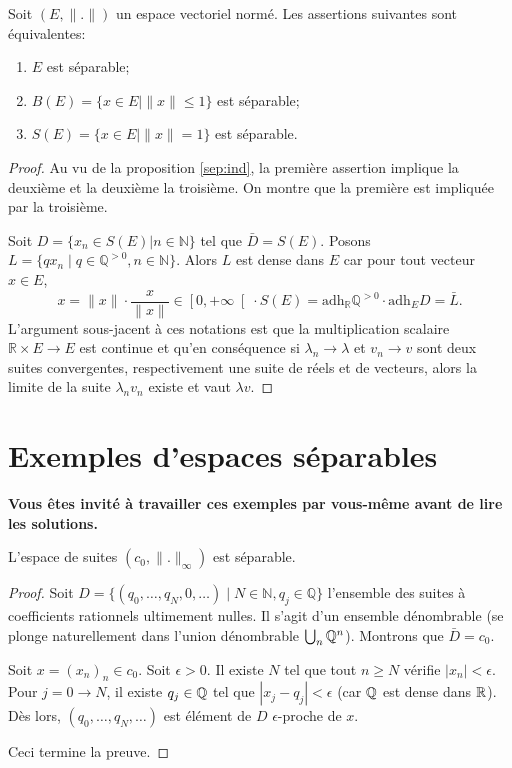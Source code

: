 \begin{prop}
  Soit $(E, \|.\|)$ un espace vectoriel normé. Les assertions suivantes sont
  équivalentes:
  \begin{enumerate}
  \item $E$ est séparable;
  \item $B(E) = \{x\in E\mid \|x\|\leq 1\}$ est séparable;
  \item $S(E) = \{x\in E\mid \|x\| =  1\}$ est séparable.
  \end{enumerate}
\end{prop}
\begin{proof}
  Au vu de la proposition \ref{sep:ind}, la première assertion implique
  la deuxième et la deuxième la troisième. On montre que la première
  est impliquée par la troisième.

  Soit $D = \{x_n \in S(E) | n\in\mathbb N\}$ tel que $\bar D = S(E)$.
  Posons $L = \{qx_n\mid q\in\mathbb Q^{>0}, n\in\mathbb N\}$. Alors $L$ est
  dense dans $E$ car pour tout vecteur $x\in E$,
  $$x = \|x\| \cdot \frac{x}{\|x\|}\in \left[0, +\infty \right[ \cdot S(E)
  = \mathrm{adh}_{\mathbb R}\mathbb Q^{>0}\cdot \mathrm{adh}_{E}D = \bar L.$$
  {L'argument sous-jacent à ces notations est que la multiplication
    scalaire $\mathbb R\times E\to E$ est continue et qu'en conséquence
    si $\lambda_n\to\lambda$ et $v_n\to v$ sont deux suites convergentes,
    respectivement une suite de réels et de vecteurs, alors la limite de
  la suite $\lambda_nv_n$ existe et vaut $\lambda v$}.
\end{proof}
\section{Exemples d'espaces séparables}
\textbf{Vous êtes invité à travailler ces exemples par vous-même avant de lire
les solutions.}
\begin{ex}
  L'espace de suites $(c_0, \|.\|_\infty)$ est séparable.
\end{ex}
\begin{proof}
  Soit $D = \{(q_0, \ldots, q_N, 0, \ldots)\mid
  N\in\mathbb N, q_j \in\mathbb Q\}$ l'ensemble des suites à coefficients
  rationnels ultimement nulles. Il s'agit d'un ensemble dénombrable
  (se plonge naturellement dans l'union dénombrable $\bigcup_{n}\mathbb{Q}^n$).
  Montrons que $\bar D = c_0$.

  Soit $x = (x_n)_n\in c_0$.
  Soit $\epsilon > 0$. Il existe $N$ tel que tout $n\geq N$
  vérifie $|x_n|<\epsilon$. Pour $j = 0 \to N$, il existe $q_j\in \mathbb{Q}$ tel
  que $|x_j-q_j|<\epsilon$ (car $\mathbb{Q}$ est dense dans $\mathbb{R}$). Dès lors,
  $(q_0, \ldots, q_N, \ldots)$ est élément de $D$ $\epsilon$-proche de $x$.

  Ceci termine la preuve.
\end{proof}

